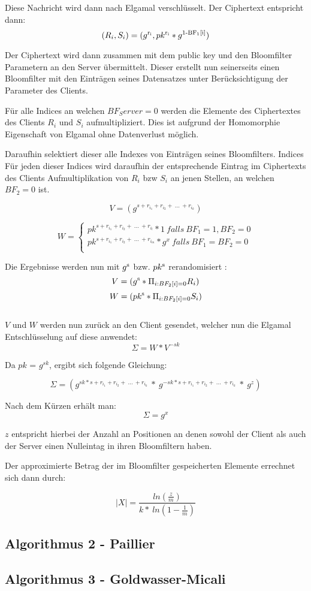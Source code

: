 Diese Nachricht wird dann nach Elgamal verschlüsselt. Der Ciphertext entspricht dann:
$$(R_i, S_i) = (g \textsuperscript{r\textsubscript{i}} , pk\textsuperscript{r\textsubscript{i}} * g\textsuperscript{1-BF\textsubscript{1}[i]})$$

Der Ciphertext wird dann zusammen mit dem public key und den Bloomfilter Parametern an den Server übermittelt.
Dieser erstellt nun seinerseits einen Bloomfilter mit den Einträgen seines Datensatzes unter Berücksichtigung der Parameter des Clients. 

Für alle Indices an welchen $BF_Server = 0$ werden die Elemente des Ciphertextes des Clients $R_i$ und $S_i$ aufmultipliziert.
Dies ist aufgrund der Homomorphie Eigenschaft von Elgamal ohne Datenverlust möglich.

Daraufhin selektiert dieser alle Indexes von Einträgen seines Bloomfilters. Indices 
Für jeden dieser Indices wird daraufhin der entsprechende Eintrag im Ciphertexts des Clients 
Aufmultiplikation  von $R_i$ bzw $S_i$ an jenen Stellen, an welchen $BF_2 = 0$ ist.

$$ V = (g^{s + r_{i_{1}} + r_{i_{2}} + \ ...\ +r_{i_{k}}})$$

\[
W =\left\{
\begin{array}{ll}
pk^{s + r_{i_{1}} + r_{i_{2}} + \ ...\ +r_{i_{l}}}*1 \ falls \ BF_{1} = 1,BF_{2} = 0 \\
pk^{s + r_{i_{1}} + r_{i_{2}} + \ ...\ +r_{i_{m}}}*g^{x} \ falls \ BF_{1} = BF_{2} = 0\\
\end{array}
\right.
\]

Die Ergebnisse werden nun mit $ g \textsuperscript{s}  $ bzw. $ pk \textsuperscript{s} $ rerandomisiert :
$$ V = (g \textsuperscript{s} * \Pi_{i:BF_{2}[i] = 0} R_{i} )$$
$$ W = (pk \textsuperscript{s} * \Pi_{i:BF_{2}[i] = 0} S_{i} )$$ \\
$ V $ und $ W $ werden nun zurück an den Client gesendet, welcher nun die Elgamal Entschlüsselung auf diese anwendet:
$$\Sigma = W * V^{-sk}$$

Da $pk$ = $g^{sk}$, ergibt sich folgende Gleichung:
	
$$\Sigma = (g^{sk * s + r_{i_{1}} + r_{i_{2}} + \ ...\ +r_{i_{k}}} \ * \ g^{-sk * s + r_{i_{1}} + r_{i_{2}} + \ ...\ +r_{i_{k}}} \ * \ g^z) $$


Nach dem Kürzen erhält man:
$$\Sigma = g^x$$

$ z $ entspricht hierbei der Anzahl  an Positionen an denen sowohl der Client als auch der Server einen Nulleintag in ihren Bloomfiltern haben.

Der approximierte Betrag der im Bloomfilter gespeicherten Elemente errechnet sich dann durch:

$$ |X| = \frac{ln( \frac{z}{m})}{k* \ ln(1- \frac{1}{m})}$$



\subsection{Algorithmus 2 - Paillier}
\label{sec:Sec2.3}




\subsection{Algorithmus 3 - Goldwasser-Micali}
\label{sec:Sec2.4}






